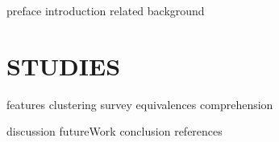 \documentclass[11pt]{isuthesis}
\begin{document}
{preface}
\newpage
{}
{introduction}
{related}
{background}

\chapter{STUDIES}
{features}
{clustering}
{survey}
{equivalences}
{comprehension}

{discussion}
{futureWork}
{conclusion}
{references}
\end{document}
